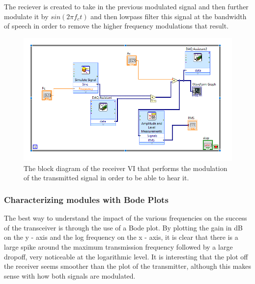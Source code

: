 \documentclass[10pt]{article}
\begin{document}
The reciever is created to take in the previous modulated signal and then further modulate it by $sin(2 \pi f_c t)$ and then lowpass filter this signal at the bandwidth of speech in order to remove the higher frequency modulations that result. 

 \begin{center}
	\begin{figure}[H]
		\centering
		\includegraphics[scale = 0.8]{images/receiverblock.png}
		\caption{The block diagram of the receiver VI that performs the modulation of the transmitted signal in order to be able to hear it.}
		\label{fig:recieverblock}
	\end{figure}
\end{center}

\subsubsection{Characterizing modules with Bode Plots}

The best way to understand the impact of the various frequencies on the success of the transceiver is through the use of a Bode plot. By plotting the gain in dB on the y - axis and the log frequency on the x - axis, it is clear that there is a large spike around the maximum transmission frequency followed by a large dropoff, very noticeable at the logarithmic level. It is interesting that the plot off the receiver seems smoother than the plot of the transmitter, although this makes sense with how both signals are modulated. 
\end{document}

